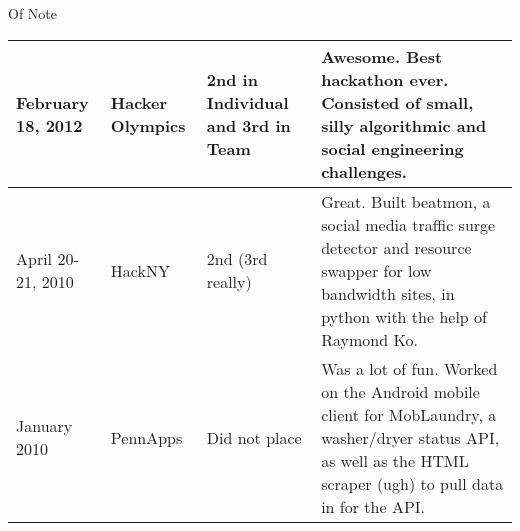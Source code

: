 \documentclass[a4paper]{article}
\begin{document}
    \begin{Large}
        Of Note \\
    \end{Large}
    \begin{tabular}{ m{3cm} m{3cm} m{3cm} m{8cm}}
        \hline  
        February 18, 2012 & Hacker Olympics & 2nd in Individual and 3rd in Team & Awesome. Best hackathon ever. Consisted of small, silly algorithmic and social engineering challenges. \\
        \hline
        April 20-21, 2010 & HackNY & 2nd (3rd really) & Great. Built beatmon, a social media traffic surge detector and resource swapper for low bandwidth sites, in python with the help of Raymond Ko. \\
        \hline
        January 2010 & PennApps & Did not place & Was a lot of fun. Worked on the Android mobile client for MobLaundry, a washer/dryer status API, as well as the HTML scraper (ugh) to pull data in for the API. \\
        \hline
    \end{tabular}
\end{document}
